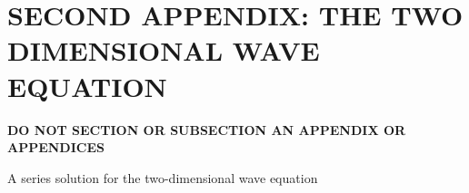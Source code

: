 \chapter{SECOND APPENDIX: THE TWO DIMENSIONAL WAVE EQUATION} \label{ap:steve_programs}

{\bf  DO NOT SECTION OR SUBSECTION AN APPENDIX OR APPENDICES}

A series solution for the two-dimensional wave equation
